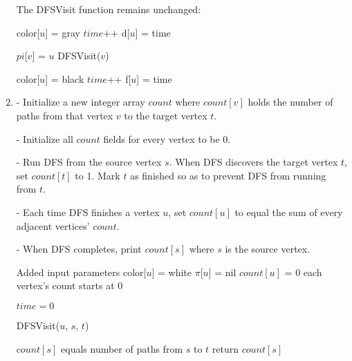 \documentclass[a4paper]{report}
\begin{document}
\begin{enumerate}
\begin{algorithmic}[1]
    \EndFunction
    \end{algorithmic}

    The DFSVisit function remains unchanged:

    \begin{algorithmic}
      \State color[$u$] = gray
      \State $time$++
      \State d[$u$] = time

          \State $pi$[$v$] = $u$
          \State DFSVisit($v$)
        \EndIf
      \EndFor

      \State color[$u$] = black
      \State $time$++
      \State f[$u$] = time
    \EndFunction
    \end{algorithmic}

    \par
    \bigskip

    \item
      - Initialize a new integer array $count$ where $count[v]$ holds the number of paths from 
      that vertex $v$ to the target vertex $t$. 

      - Initialize all $count$ fields for every vertex to be 0. 

      - Run DFS from the source vertex $s$. When DFS discovers the target vertex $t$,
      set $count[t]$ to 1. Mark $t$ as finished so as to prevent DFS from running from $t$.

      - Each time DFS finishes a vertex $u$, set $count[u]$ to equal the sum of every adjacent
      vertices' $count$.

      - When DFS completes, print $count[s]$ where $s$ is the source vertex.

      \begin{algorithmic}[1]

      \Comment Added input parameters
        \State color[$u$] = white
        \State $\pi$[$u$] = nil
        \State $count[u]$ = 0 
      \Comment each vertex's count starts at 0

      \EndFor
      \State $time=0$


          \State DFSVisit($u$, $s$, $t$)
        \EndIf
      \EndFor

      \Comment $count[s]$ equals number of paths from $s$ to $t$
      \State return $count[s]$


\end{algorithmic}
\end{enumerate}
\end{document}
